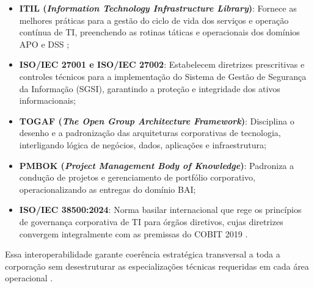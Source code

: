 \begin{itemize}
    \item \textbf{ITIL (\textit{Information Technology Infrastructure Library})}: Fornece as melhores práticas para a gestão do ciclo de vida dos serviços e operação contínua de TI, preenchendo as rotinas táticas e operacionais dos domínios APO e DSS \cite{fernandes2014implantando};
    \item \textbf{ISO/IEC 27001 e ISO/IEC 27002}: Estabelecem diretrizes prescritivas e controles técnicos para a implementação do Sistema de Gestão de Segurança da Informação (SGSI), garantindo a proteção e integridade dos ativos informacionais;
    \item \textbf{TOGAF (\textit{The Open Group Architecture Framework})}: Disciplina o desenho e a padronização das arquiteturas corporativas de tecnologia, interligando lógica de negócios, dados, aplicações e infraestrutura;
    \item \textbf{PMBOK (\textit{Project Management Body of Knowledge})}: Padroniza a condução de projetos e gerenciamento de portfólio corporativo, operacionalizando as entregas do domínio BAI;
    \item \textbf{ISO/IEC 38500:2024}: Norma basilar internacional que rege os princípios de governança corporativa de TI para órgãos diretivos, cujas diretrizes convergem integralmente com as premissas do COBIT 2019 \cite{iso2024iso38500}.
\end{itemize}

Essa interoperabilidade garante coerência estratégica transversal a toda a corporação sem desestruturar as especializações técnicas requeridas em cada área operacional \cite{isaca2019framework,feely2007getting}.
